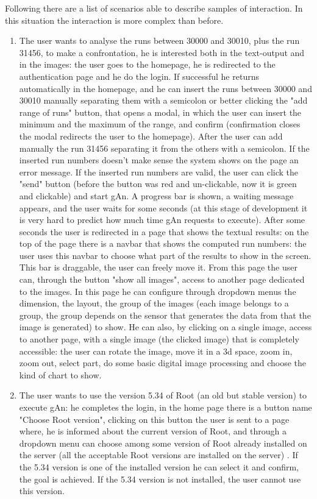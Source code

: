 Following there are a list of scenarios able to describe samples of interaction. In this situation the interaction is more complex than before.

\begin{enumerate}

\item The user wants to analyse the runs between 30000 and 30010, plus the run 31456, to make a confrontation, he is interested both in the text-output and in the images: 
the user goes to the homepage, he is redirected to the authentication page and he do the login. If successful he returns automatically in the homepage, and he can insert the runs between 30000 and 30010 manually separating them with a semicolon or better clicking the "add range of runs" button, that opens a modal, in which the user can insert the minimum and the maximum of the range, and confirm (confirmation closes the modal redirects the user to the homepage). After the user can add manually the run 31456 separating it from the others with a semicolon. If the inserted run numbers doesn't make sense the system shows on the page an error message. If the inserted run numbers are valid, the user can click the "send" button (before the button was red and un-clickable, now it is green and clickable) and start gAn. A progress bar is shown, a waiting message appears, and the user waits for some seconds (at this stage of development it is very hard to predict how much time gAn requests to execute). After some seconds the user is redirected in a page that shows the textual results: on the top of the page there is a navbar that shows the computed run numbers: the user uses this navbar to choose what part of the results to show in the screen. This bar is draggable, the user can freely move it. From this page the user can, through the button "show all images", access to another page dedicated to the images. In this page he can configure through dropdown menus the dimension, the layout, the group of the images (each image belongs to a group, the group depends on the sensor that generates the data from that the image is generated) to show. He can also, by clicking on a single image, access to another page, with a single image (the clicked image) that is completely accessible: the user can rotate the image, move it in a 3d space, zoom in, zoom out, select part, do some basic digital image processing and choose the kind of chart to show.   

\item The user wants to use the version 5.34 of Root (an old but stable version) to execute gAn: 
he completes the login, in the home page there is a button name "Choose Root version", clicking on this button the user is sent to a page where, he is informed about the current version of Root, and through a dropdown menu can choose among some version of Root already installed on the server (all the acceptable Root versions are installed on the server) . If the 5.34 version is one of the installed version he can select it and confirm, the goal is achieved. If the 5.34 version is not installed, the user cannot use this version.  


\end{enumerate}
